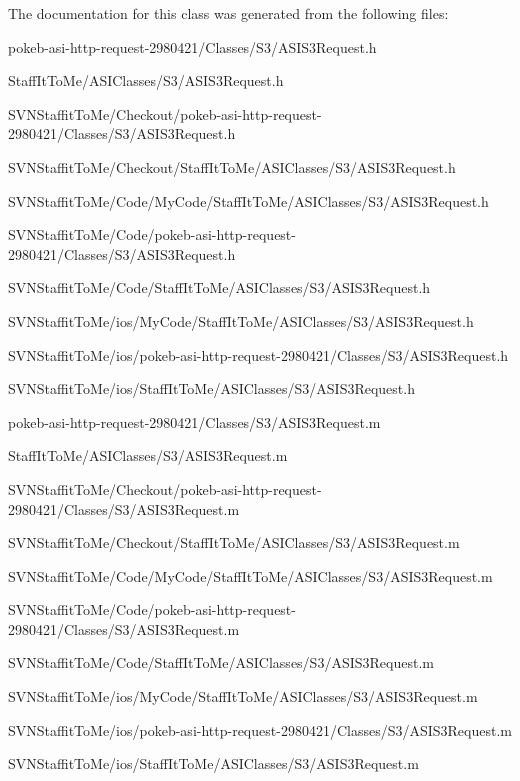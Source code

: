 \-The documentation for this class was generated from the following files\-:\begin{DoxyCompactItemize}
\item 
pokeb-\/asi-\/http-\/request-\/2980421/\-Classes/\-S3/\-A\-S\-I\-S3\-Request.\-h\item 
\-Staff\-It\-To\-Me/\-A\-S\-I\-Classes/\-S3/\-A\-S\-I\-S3\-Request.\-h\item 
\-S\-V\-N\-Staffit\-To\-Me/\-Checkout/pokeb-\/asi-\/http-\/request-\/2980421/\-Classes/\-S3/\-A\-S\-I\-S3\-Request.\-h\item 
\-S\-V\-N\-Staffit\-To\-Me/\-Checkout/\-Staff\-It\-To\-Me/\-A\-S\-I\-Classes/\-S3/\-A\-S\-I\-S3\-Request.\-h\item 
\-S\-V\-N\-Staffit\-To\-Me/\-Code/\-My\-Code/\-Staff\-It\-To\-Me/\-A\-S\-I\-Classes/\-S3/\-A\-S\-I\-S3\-Request.\-h\item 
\-S\-V\-N\-Staffit\-To\-Me/\-Code/pokeb-\/asi-\/http-\/request-\/2980421/\-Classes/\-S3/\-A\-S\-I\-S3\-Request.\-h\item 
\-S\-V\-N\-Staffit\-To\-Me/\-Code/\-Staff\-It\-To\-Me/\-A\-S\-I\-Classes/\-S3/\-A\-S\-I\-S3\-Request.\-h\item 
\-S\-V\-N\-Staffit\-To\-Me/ios/\-My\-Code/\-Staff\-It\-To\-Me/\-A\-S\-I\-Classes/\-S3/\-A\-S\-I\-S3\-Request.\-h\item 
\-S\-V\-N\-Staffit\-To\-Me/ios/pokeb-\/asi-\/http-\/request-\/2980421/\-Classes/\-S3/\-A\-S\-I\-S3\-Request.\-h\item 
\-S\-V\-N\-Staffit\-To\-Me/ios/\-Staff\-It\-To\-Me/\-A\-S\-I\-Classes/\-S3/\-A\-S\-I\-S3\-Request.\-h\item 
pokeb-\/asi-\/http-\/request-\/2980421/\-Classes/\-S3/\-A\-S\-I\-S3\-Request.\-m\item 
\-Staff\-It\-To\-Me/\-A\-S\-I\-Classes/\-S3/\-A\-S\-I\-S3\-Request.\-m\item 
\-S\-V\-N\-Staffit\-To\-Me/\-Checkout/pokeb-\/asi-\/http-\/request-\/2980421/\-Classes/\-S3/\-A\-S\-I\-S3\-Request.\-m\item 
\-S\-V\-N\-Staffit\-To\-Me/\-Checkout/\-Staff\-It\-To\-Me/\-A\-S\-I\-Classes/\-S3/\-A\-S\-I\-S3\-Request.\-m\item 
\-S\-V\-N\-Staffit\-To\-Me/\-Code/\-My\-Code/\-Staff\-It\-To\-Me/\-A\-S\-I\-Classes/\-S3/\-A\-S\-I\-S3\-Request.\-m\item 
\-S\-V\-N\-Staffit\-To\-Me/\-Code/pokeb-\/asi-\/http-\/request-\/2980421/\-Classes/\-S3/\-A\-S\-I\-S3\-Request.\-m\item 
\-S\-V\-N\-Staffit\-To\-Me/\-Code/\-Staff\-It\-To\-Me/\-A\-S\-I\-Classes/\-S3/\-A\-S\-I\-S3\-Request.\-m\item 
\-S\-V\-N\-Staffit\-To\-Me/ios/\-My\-Code/\-Staff\-It\-To\-Me/\-A\-S\-I\-Classes/\-S3/\-A\-S\-I\-S3\-Request.\-m\item 
\-S\-V\-N\-Staffit\-To\-Me/ios/pokeb-\/asi-\/http-\/request-\/2980421/\-Classes/\-S3/\-A\-S\-I\-S3\-Request.\-m\item 
\-S\-V\-N\-Staffit\-To\-Me/ios/\-Staff\-It\-To\-Me/\-A\-S\-I\-Classes/\-S3/\-A\-S\-I\-S3\-Request.\-m\end{DoxyCompactItemize}
